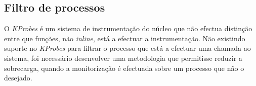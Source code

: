 \subsection{Filtro de processos}







O \textit{KProbes} é um sistema de instrumentação do núcleo que não efectua distinção entre que funções, não \textit{inline}, está a efectuar a instrumentação.
Não existindo suporte no \textit{KProbes} para filtrar o processo que está a efectuar uma chamada ao sistema, foi necessário desenvolver uma metodologia que permitisse reduzir a sobrecarga, quando a monitorização é efectuada sobre um processo que não o desejado.




